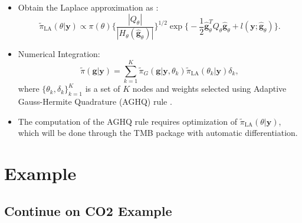 \documentclass{beamer} %
\begin{document}
\begin{frame}

\begin{itemize}
\pause
\item Obtain the Laplace approximation as \cite{tierney1986accurate}:
\begin{equation}\label{LaplaceApproxi}
\tilde{\pi}_\text{LA}(\theta|\boldsymbol{y}) \propto \pi(\theta) \bigg\{\frac{|Q_\theta|}{|H_\theta(\hat{\boldsymbol{g}}_\theta)|} \bigg\}^{1/2} \exp \bigg\{ -\frac{1}{2}  \hat{\boldsymbol{g}}_\theta^T Q_\theta  \hat{\boldsymbol{g}}_\theta + l(\boldsymbol{y};\hat{\boldsymbol{g}}_\theta) \bigg\}.
\end{equation}

\pause
\item Numerical Integration:
\begin{equation}\label{finalApproxi}
\tilde{\pi}(\boldsymbol{g}|\boldsymbol{y}) = \sum_{k=1}^K \tilde{\pi}_G(\boldsymbol{g}|\boldsymbol{y}, \theta_k) \tilde{\pi}_{\text{LA}}(\theta_k|\boldsymbol{y}) \delta_k,
\end{equation}
where $\{\theta_k, \delta_k\}_{k=1}^K$ is a set of $K$ nodes and weights selected using Adaptive Gauss-Hermite Quadrature (AGHQ) rule \citep{aghq}. 
\pause
\item The computation of the AGHQ rule requires optimization of $\tilde{\pi}_\text{LA}(\theta|\boldsymbol{y})$, which will be done through the TMB package \citep{kristensen2015tmb} with automatic differentiation.
\end{itemize}
\end{frame}


\section{Example}

\subsection{Continue on CO2 Example}
\end{document}
